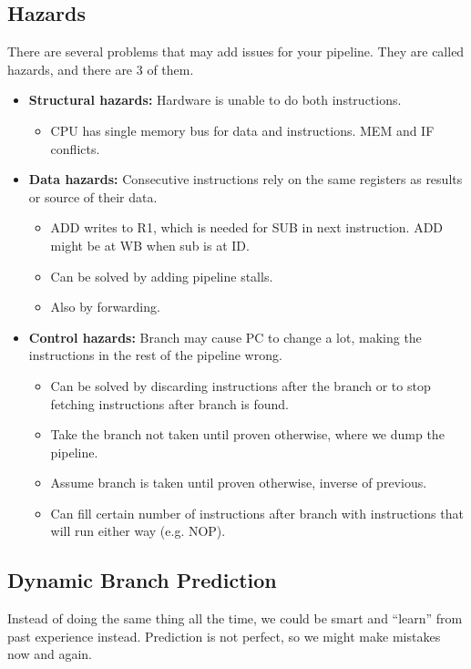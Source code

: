 \documentclass{article}
\theoremstyle{remark}
\begin{document}
\subsection{Hazards}
There are several problems that may add issues for your pipeline. They are called hazards, and there are 3 of them.
\begin{itemize}
    \item \textbf{Structural hazards:} Hardware is unable to do both instructions.
          \begin{itemize}
              \item CPU has single memory bus for data and instructions. MEM and IF conflicts.
          \end{itemize}
    \item \textbf{Data hazards:} Consecutive instructions rely on the same registers as results or source of their data.
          \begin{itemize}
              \item ADD writes to R1, which is needed for SUB in next instruction. ADD might be at WB when sub is at ID.\@
              \item Can be solved by adding pipeline stalls.
              \item Also by forwarding.
          \end{itemize}
    \item \textbf{Control hazards:} Branch may cause PC to change a lot, making the instructions in the rest of the pipeline wrong.
          \begin{itemize}
              \item Can be solved by discarding instructions after the branch or to stop fetching instructions after branch is found.
              \item Take the branch not taken until proven otherwise, where we dump the pipeline.
              \item Assume branch is taken until proven otherwise, inverse of previous.
              \item Can fill certain number of instructions after branch with instructions that will run either way (e.g. NOP).
          \end{itemize}
\end{itemize}

\subsection{Dynamic Branch Prediction}
Instead of doing the same thing all the time, we could be smart and ``learn'' from past experience instead. Prediction is not perfect, so we might make mistakes now and again.
\end{document}
